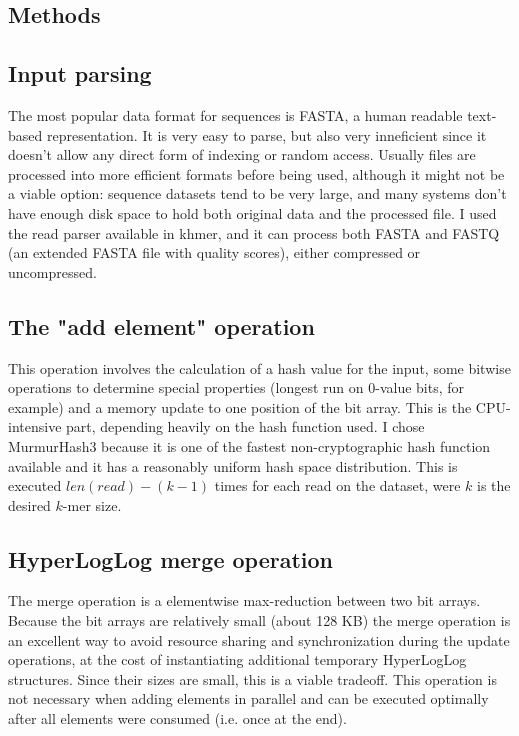 \documentclass{bioinfo}
\begin{document}
\begin{methods}
\section{Methods}

\subsection{Input parsing}

The most popular data format for sequences is FASTA,
a human readable text-based representation.
It is very easy to parse,
but also very inneficient since it doesn't allow any direct form of indexing or random access.
Usually files are processed into more efficient formats before being used,
although it might not be a viable option:
sequence datasets tend to be very large,
and many systems don't have enough disk space to hold both original data and the processed file.
I used the read parser available in khmer,
and it can process both FASTA and FASTQ (an extended FASTA file with quality scores),
either compressed or uncompressed.

\subsection{The "add element" operation}

This operation involves the calculation of a hash value for the input,
some bitwise operations to determine special properties (longest run on 0-value bits, for example)
and a memory update to one position of the bit array.
This is the CPU-intensive part,
depending heavily on the hash function used.
I chose MurmurHash3 because it is one of the fastest non-cryptographic hash function available
and it has a reasonably uniform hash space distribution.
This is executed $len(read) - (k-1)$ times for each read on the dataset,
were $k$ is the desired $k$-mer size.

\subsection{HyperLogLog merge operation}

The merge operation is a elementwise max-reduction between two bit arrays.
Because the bit arrays are relatively small (about 128 KB) the merge operation is an excellent way to avoid resource sharing and synchronization during the update operations,
at the cost of instantiating additional temporary HyperLogLog structures.
Since their sizes are small,
this is a viable tradeoff.
This operation is not necessary when adding elements in parallel and can be executed
optimally after all elements were consumed (i.e. once at the end).


\end{methods}
\end{document}
